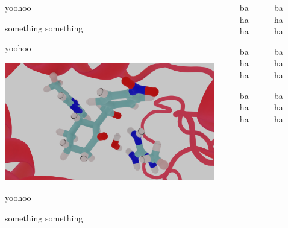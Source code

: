 \documentclass[final]{beamer}
\newlength{\sepwidth}
\newlength{\colwidth}
\newcommand{\separatorcolumn}{\begin{column}{\sepwidth}\end{column}}
\begin{document}
\begin{frame}[t]
  \begin{columns}[t]
    \separatorcolumn
    
    \begin{column}{\colwidth}
    
        \begin{block}{yoohoo}
        
        something something
        
        \end{block}
        \begin{block}{yoohoo}
        
          \includegraphics[scale=0.5]{figures/reac-81.png}
        
        \end{block}
        \begin{block}{yoohoo}
        
        something something
        
        \end{block}
    \end{column}
    \separatorcolumn
\begin{column}{\colwidth}
  \begin{block}{bahaha}

  \end{block}
  \begin{block}{bahaha}

  \end{block}
  \begin{block}{bahaha}

  \end{block}
\end{column}
\separatorcolumn
\begin{column}{\colwidth}
  \begin{block}{bahaha}

  \end{block}
  \begin{block}{bahaha}

  \end{block}
  \begin{block}{bahaha}

  \end{block}
\end{column}
\separatorcolumn
  \end{columns}
\end{frame}
\end{document}

